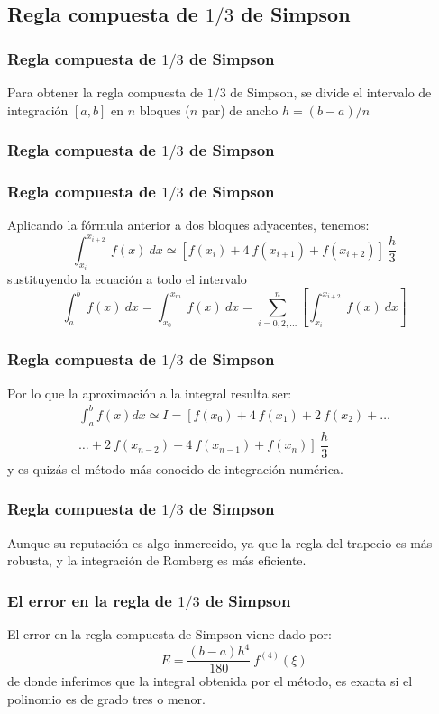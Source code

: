 \subsection{Regla compuesta de $1/3$ de Simpson}
\begin{frame}
\frametitle{Regla compuesta de $1/3$ de Simpson}
Para obtener la regla compuesta de $1/3$ de Simpson, se divide el intervalo de integración $[a, b]$ en $n$ bloques ($n$ par) de ancho $h = (b - a)/n$
\end{frame}
\begin{frame}
\frametitle{Regla compuesta de $1/3$ de Simpson}
\begin{figure}
	\centering
	
\end{figure}
\end{frame}
\begin{frame}
\frametitle{Regla compuesta de $1/3$ de Simpson}
Aplicando la fórmula anterior a dos bloques adyacentes, tenemos:
\[ \int_{x_{i}}^{x_{i + 2}} \: f(x) \: dx \simeq \left[ f(x_{i}) + 4 \: f(x_{i + 1}) + f(x_{i + 2}) \right] \: \dfrac{h}{3} \]
sustituyendo la ecuación a todo el intervalo
\[ \int_{a}^{b} \: f(x) \: dx = \int_{x_{0}}^{x_{m}} \: f(x) \: dx = \sum_{i = 0, 2,\ldots}^{n} \left[ \int_{x_{i}}^{x_{i + 2}} \: f(x) \: dx \right] \]
\end{frame}
\begin{frame}
\frametitle{Regla compuesta de $1/3$ de Simpson}
Por lo que la aproximación a la integral resulta ser:
\[ \begin{split}
\int_{a}^{b} f(x) dx \simeq I = \left[ f(x_{0}) + 4 \: f(x_{1}) + 2 \: f(x_{2}) + \ldots  \right. \\
\left. \ldots + 2 \: f(x_{n-2}) + 4 \: f(x_{n - 1}) + f(x_{n}) \right] \: \dfrac{h}{3}
\end{split} \]
\pause
y es quizás el método más conocido de integración numérica. 
\end{frame}
\begin{frame}
\frametitle{Regla compuesta de $1/3$ de Simpson}
Aunque su reputación es algo inmerecido, ya que la regla del trapecio es más robusta, y la integración de Romberg es más eficiente.
\end{frame}
\begin{frame}
\frametitle{El error en la regla de $1/3$ de Simpson}
El error en la regla compuesta de Simpson viene dado por:
\[ E = \dfrac{(b - a)h^{4}}{180} \: f^{(4)}(\xi) \]
de donde inferimos que la integral obtenida por el método, es exacta si el polinomio es de grado tres o menor.
\end{frame}
